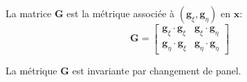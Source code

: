 \begin{definition}
La matrice $\mathbf{G}$ est la métrique associée à $(\mathbf{g}_{\xi}, \mathbf{g}_{\eta})$ en $\mathbf{x}$:
\begin{equation}
\mathbf{G} = \begin{bmatrix}
\mathbf{g}_{\xi} \cdot \mathbf{g}_{\xi} & \mathbf{g}_{\xi} \cdot \mathbf{g}_{\eta} \\
\mathbf{g}_{\eta} \cdot \mathbf{g}_{\xi} & \mathbf{g}_{\eta} \cdot \mathbf{g}_{\eta}
\end{bmatrix}
\end{equation}
\end{definition}

\begin{proposition}
La métrique $\mathbf{G}$ est invariante par changement de panel.
\end{proposition}

